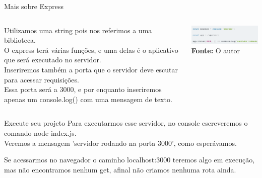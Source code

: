 \documentclass{beamer}
\begin{document}
    \begin{frame}[label=lists]{Mais sobre Express}

      \begin{columns}[onlytextwidth]
         Utilizamos uma string pois nos referimos a uma biblioteca.\\
         O express terá várias funções, e uma delas é o aplicativo que será executado no servidor. \\
         Inseriremos também a porta que o servidor deve escutar para acessar requisições. \\
         Essa porta será a 3000, e por enquanto inseriremos apenas um console.log() com uma mensagem de texto.        
          \vspace{0.5cm}
	
            \includegraphics[width=65mm]{resources/aula2_1.png}\\
            \tiny{\textbf{Fonte:} O autor}

      \end{columns}
    \end{frame}
     \begin{frame}[label=lists]{Execute seu projeto}
    Para executarmos esse servidor, no console escreveremos o comando \alert{node index.js}. \\
    Veremos a mensagem 'servidor rodando na porta 3000', como esperávamos.
    \vspace{0.5cm}

	Se acessarmos no navegador o caminho \alert{localhost:3000} teremos algo em execução, mas não encontramos nenhum get, afinal não criamos nenhuma rota ainda.
    \end{frame}
%
%
  
\end{document}
